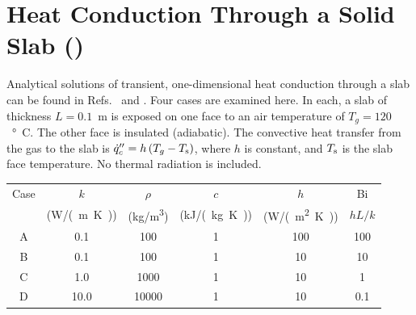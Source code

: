\documentclass[11pt]{book}
\begin{document}
\clearpage

\section{Heat Conduction Through a Solid Slab (\texorpdfstring{}{heat\_conduction})}

Analytical solutions of transient, one-dimensional heat conduction through a slab can be found in Refs.~\cite{Drysdale:1} and \cite{Carslaw:1}. Four
cases are examined here. In each, a slab of thickness $L=0.1$~m is exposed on one face to an air temperature of $T_g=120$~\si{\degree C}. The other face
is insulated (adiabatic). The convective heat transfer from the gas to the slab is $\dot{q}_c'' = h \, (T_g - T_{\rm s})$, where $h$ is constant, and $T_{\rm s}$ is
the slab face temperature. No thermal radiation is included.
\begin{center}
\begin{tabular}{|c|c|c|c|c|c|}
\hline
Case  &  $k$      & $\rho$       &  $c$          &   $h$         &  Bi     \\
      & (\si{W/(m.K)})  & (\si{kg/m^3})   &  (\si{kJ/(kg.K)})    &  (\si{W/(m^2.K)})  &  $hL/k$ \\ \hline \hline
A     &   0.1     & 100          &  1            &  100          &  100    \\ \hline
B     &   0.1     & 100          &  1            &  10           &  10     \\ \hline
C     &   1.0     & 1000         &  1            &  10           &  1      \\ \hline
D     &  10.0     & 10000        &  1            &  10           & 0.1     \\ \hline
\end{tabular}
\end{center}
\end{document}
